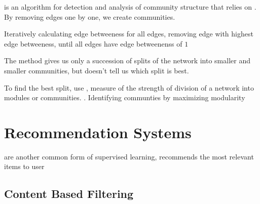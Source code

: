 \documentclass[12pt]{scrartcl}
\begin{document}
\begin{definition}
   is an algorithm for detection and analysis 
  of community structure that relies on . 
  By removing edges one by one, we create communities.

  Iteratively calculating edge betweeness for all edges, removing edge with highest edge betweeness, 
  until all edges have edge betweenenss of $1$

  The method gives us only a succession of splits of the network into smaller and smaller communities, but 
  doesn't tell us which split is best.
\end{definition}

\begin{definition}
  To find the best split, use , measure of the strength of division of a network into modules or communities.
  . Identifying communties by maximizing modularity
\end{definition}

\section{Recommendation Systems}

\begin{definition}
   are another common form of supervised learning, 
  recommends the most relevant items to user
\end{definition}

\subsection{Content Based Filtering}
\end{document}
